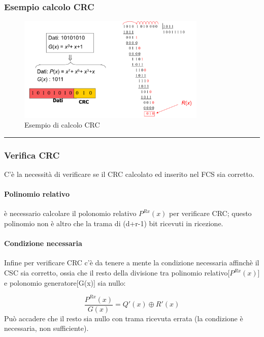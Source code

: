  \subsubsection{Esempio calcolo CRC}
    \begin{figure}[htbp]
        \centering
        \includegraphics[width=0.8\textwidth]{images/esempiocrc.png}
        \caption{Esempio di calcolo CRC}
        \label{fig:esempio-crc}
    \end{figure}

\vspace{0.3em}
\noindent\rule{\linewidth}{0.4pt}
\vspace{0.3em}

\subsubsection{Verifica CRC}

C'è la necessità di verificare se il CRC calcolato ed inserito nel FCS sia corretto.
\paragraph{Polinomio relativo} è necessario calcolare il polonomio relativo $P^{Rx}(x)$ per verificare CRC; questo polinomio non è altro che la trama di (d+r-1) bit ricevuti in ricezione.
\paragraph{Condizione necessaria}
Infine per verificare CRC c'è da tenere a mente la condizione necessaria affinchè il CSC sia corretto, ossia che il resto della divisione tra polinomio relativo[$P^{Rx}(x)$] e polonomio generatore[G(x)] sia nullo:

\begin{equation}
    \frac{P^{Rx}(x)}{G(x)} = Q'(x) \oplus R'(x)
\end{equation}
Può accadere che il resto sia nullo con trama ricevuta errata (la condizione è necessaria, non sufficiente). 

